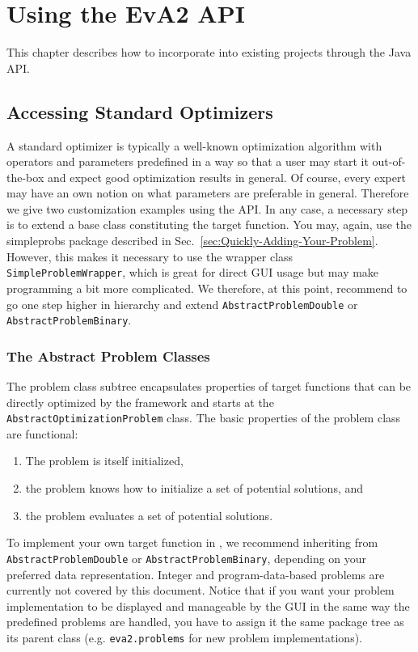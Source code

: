 \chapter{Using the EvA2 API\label{sec:Using-the-API}}

This chapter describes how to incorporate  into existing
projects through the Java API.


\section{Accessing Standard Optimizers\label{sub:Accessing-Standard-Optimizers}}

A standard optimizer is typically a well-known optimization algorithm
with operators and parameters predefined in a way so that a user may
start it out-of-the-box and expect good optimization results in general.
Of course, every expert may have an own notion on what parameters
are preferable in general. Therefore we give two customization examples
using the API. In any case, a necessary step is to extend a 
base class constituting the target function. You may, again, use the
simpleprobs package described in Sec.~\ref{sec:Quickly-Adding-Your-Problem}.
However, this makes it necessary to use the wrapper class \texttt{SimpleProblemWrapper},
which is great for direct GUI usage but may make programming a bit
more complicated. We therefore, at this point, recommend to go one
step higher in hierarchy and extend \texttt{AbstractProblemDouble}
or \texttt{AbstractProblemBinary}.


\subsection{The Abstract Problem Classes\label{sub:The-Abstract-Problem-classes}}

The problem class subtree encapsulates properties of target functions
that can be directly optimized by the  framework and starts
at the \texttt{AbstractOptimizationProblem} class. The basic properties
of the problem class are functional: 
\begin{enumerate}
\item The problem is itself initialized, 
\item the problem knows how to initialize a set of potential solutions,
and 
\item the problem evaluates a set of potential solutions. 
\end{enumerate}
To implement your own target function in , we recommend
inheriting from \texttt{AbstractProblemDouble} or \texttt{AbstractProblemBinary},
depending on your preferred data representation. Integer and program-data-based
problems are currently not covered by this document. Notice that if
you want your problem implementation to be displayed and manageable
by the GUI in the same way the predefined problems are handled, you
have to assign it the same package tree as its parent class (e.g.
\texttt{eva2.problems} for new problem implementations).


